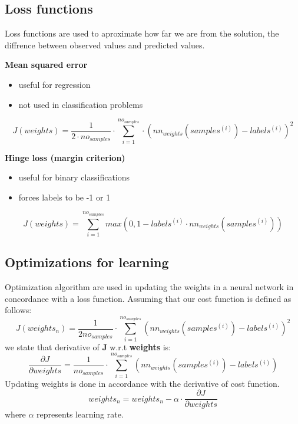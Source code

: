 \newpage
\subsection{Loss functions}
\label{loss}

Loss functions are used to aproximate how far we are from the solution, the diffrence between observed values and predicted values.

\textbf{Mean squared error}
\begin{itemize}
	\item{useful for regression}
	\item{not used in classification problems}
\end{itemize}
\begin{equation}
J(weights) = \frac{1}{2\cdot no_{samples}}\cdot\displaystyle\sum_{i=1}^{no_{samples}}\cdot(nn_{weights}(samples^{(i)}) - labels^{(i)})^2
\end{equation}

\textbf{Hinge loss (margin criterion)}
\begin{itemize}
	\item{useful for binary classifications}
	\item{forces labels to be -1 or 1}
\end{itemize}
\begin{equation}
J(weights) = \displaystyle\sum_{i=1}^{no_{samples}}max(0, 1 - labels^{(i)}\cdot nn_{weights}(samples^{(i)}))
\end{equation}


\subsection{Optimizations for learning\cite{ng}}
Optimization algorithm are used in updating the weights in a neural network in concordance with a loss function.
\label{optimization}
Assuming that our cost function is defined as follows:
\begin{equation}
	J(weights_n) = \frac{1}{2no_{samples}}\cdot\displaystyle\sum_{i=1}^{no_{samples}}(nn_{weights}(samples^{(i)}) - labels^{(i)})^2
\end{equation}
we state that derivative of \textbf{J} w.r.t \textbf{weights} is:
\begin{equation}
	\frac{\partial J}{\partial weights} = \frac{1}{no_{samples}}\cdot\displaystyle\sum_{i=1}^{no_{samples}}(nn_{weights}(samples^{(i)}) - labels^{(i)})
\end{equation}
Updating weights is done in accordance with the derivative of cost function.
\begin{equation}
	weights_n = weights_n - \alpha\cdot\frac{\partial J}{\partial weights}
\end{equation}
where $\alpha$ represents learning rate.

